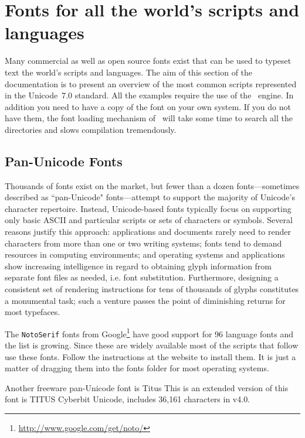\section{Fonts for all the world's scripts and languages}

Many commercial as well as open source fonts exist that can be used to typeset text the world's scripts and languages. The aim of this section of the documentation is to present an overview of the most common scripts represented in the Unicode~7.0 standard. All the examples require the use of the \XeTeX\ engine. In addition you need to have a copy of the font on your own system. If you do not have them, the font loading mechanism of \XeTeX\ will take some time to search all the directories and slows compilation tremendously. 

\subsection{Pan-Unicode Fonts}

Thousands of fonts exist on the market, but fewer than a dozen fonts—sometimes described as ``pan-Unicode" fonts—attempt to support the majority of Unicode's character repertoire. Instead, Unicode-based fonts typically focus on supporting only basic ASCII and particular scripts or sets of characters or symbols. Several reasons justify this approach: applications and documents rarely need to render characters from more than one or two writing systems; fonts tend to demand resources in computing environments; and operating systems and applications show increasing intelligence in regard to obtaining glyph information from separate font files as needed, i.e. font substitution. Furthermore, designing a consistent set of rendering instructions for tens of thousands of glyphs constitutes a monumental task; such a venture passes the point of diminishing returns for most typefaces.

The \texttt{NotoSerif} fonts from Google\footnote{\protect\url{http://www.google.com/get/noto/}} have good support for 96 language fonts and the list is growing. Since these are widely available most of the scripts that follow use these fonts. Follow the instructions at the website to install them. It is just a matter of dragging them into the fonts folder for most operating systems.

Another freeware pan-Unicode font is Titus
This is an extended version of this font is TITUS Cyberbit Unicode, includes 36,161 characters in v4.0.


